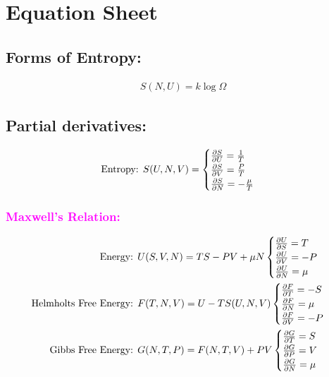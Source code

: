 

\section{Equation Sheet}

\subsection*{Forms of Entropy:}

\begin{align}
	S(N, U) = k \log \Omega
\end{align}

\subsection*{Partial derivatives:}

\begin{align}
	\text{Entropy: } S(U, N, V) =
	\begin{cases}
		\pdv{S}{U} = \frac{1}{T}    \\
		\pdv{S}{V} = \frac{P}{T}    \\
		\pdv{S}{N} = -\frac{\mu}{T} \\
	\end{cases}
\end{align}

\subsubsection*{\textcolor{magenta}{Maxwell's Relation:}}

\begin{align}
	\text{Energy: }                & U(S, V, N) = TS - PV + \mu N
	\begin{cases}
		\pdv{U}{S} = T   \\
		\pdv{U}{V} = -P  \\
		\pdv{U}{N} = \mu \\
	\end{cases}                                               \\
	\text{Helmholts Free Energy: } & F(T, N, V) = U - T S(U, N, V)
	\begin{cases}
		\pdv{F}{T} = -S  \\
		\pdv{F}{N} = \mu \\
		\pdv{F}{V} = -P  \\
	\end{cases}                                               \\
	\text{Gibbs Free Energy: }     & G(N, T, P) = F(N, T, V) + PV
	\begin{cases}
		\pdv{G}{T} = S   \\
		\pdv{G}{P} = V   \\
		\pdv{G}{N} = \mu \\
	\end{cases}                                               \\
\end{align}

